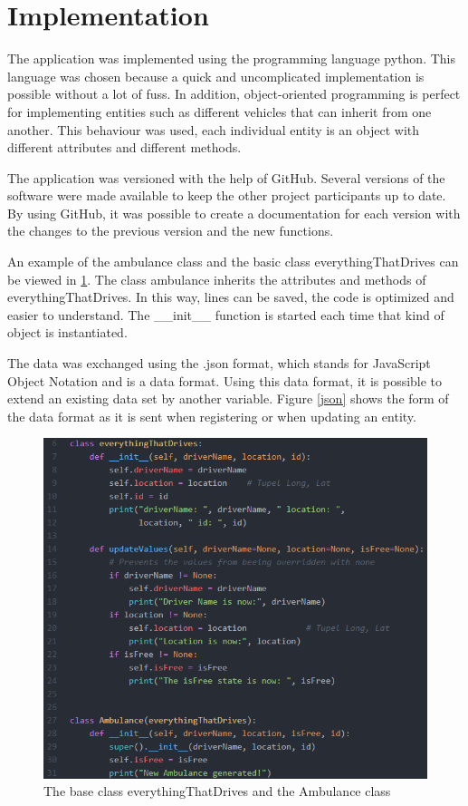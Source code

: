 \section{Implementation}
\label{sec:4}

The application was implemented using the programming language python. This language was chosen because a quick and uncomplicated implementation is possible without a lot of fuss. In addition, object-oriented programming is perfect for implementing entities such as different vehicles that can inherit from one another. This behaviour was used, each individual entity is an object with different attributes and different methods. 

The application was versioned with the help of GitHub. Several versions of the software were made available to keep the other project participants up to date. By using GitHub, it was possible to create a documentation for each version with the changes to the previous version and the new functions.

An example of the ambulance class and the basic class everythingThatDrives can be viewed in \ref{entity}. The class ambulance inherits the attributes and methods of everythingThatDrives. In this way, lines can be saved, the code is optimized and easier to understand. The \_\_init\_\_ function is started each time that kind of object is instantiated.

The data was exchanged using the .json format, which stands for JavaScript Object Notation and is a data format. Using this data format, it is possible to extend an existing data set by another variable. Figure \ref{json} shows the form of the data format as it is sent when registering or when updating an entity.

\begin{figure}
\sidecaption
\includegraphics[scale=0.6]{images/walter/code/entity.png}
\caption{The base class everythingThatDrives and the Ambulance class}
\label{entity}
\end{figure}

